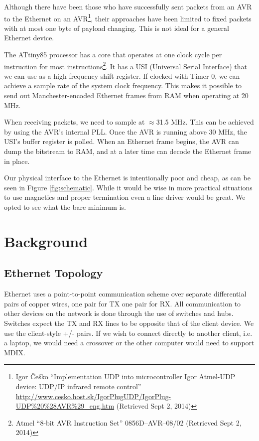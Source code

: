 \documentclass[13pt]{ltxdoc}
\begin{document}
Although there have been those who have successfully sent packets from an AVR to
the Ethernet on an AVR\footnote{Igor \v{C}e\v{s}ko ``Implementation UDP into microcontroller Igor Atmel-UDP device: UDP/IP infrared remote control'' \url{http://www.cesko.host.sk/IgorPlugUDP/IgorPlug-UDP\%20\%28AVR\%29_eng.htm} (Retrieved Sept 2, 2014)}, their approaches have been limited
to fixed packets with at most one byte of payload changing.  This is not ideal
for a general Ethernet device.

The ATtiny85 processor has a core that operates at one clock cycle per instruction
for most instructions\footnote{Atmel ``8-bit AVR Instruction Set'' 0856D–AVR–08/02 (Retrieved Sept 2, 2014)}.  It has a USI (Universal Serial Interface)
that we can use as a high frequency shift register.  If clocked with Timer 0, 
we can achieve a sample rate of the system clock frequency.  This makes it possible
to send out Manchester-encoded Ethernet frames from RAM when operating at 20 MHz. 

When receiving packets, we need to sample at $\approx$31.5 MHz.  This can be achieved
by using the AVR's internal PLL.  Once the AVR is running above 30 MHz, the USI's 
buffer register is polled.  When an Ethernet frame begins, the AVR can dump the 
bitstream to RAM, and at a later time can decode the Ethernet frame in place.

Our physical interface to the Ethernet is intentionally poor and cheap, as can be seen in
Figure \ref{fig:schematic}.  While
it would be wise in more practical situations to use magnetics and proper termination
even a line driver would be great.  We opted to see what the bare minimum is.

\section{Background}

\subsection{Ethernet Topology}
Ethernet uses a point-to-point communication scheme over separate differential pairs of copper wires, one pair for TX one pair for RX. 
All communication to other devices on the network
is done through the use of switches and hubs.  Switches expect the TX and RX lines to
be opposite that of the client device.  We use the client-style +/- pairs.  If we wish
to connect directly to another client, i.e. a laptop, we would need a crossover or the
other computer would need to support MDIX.
\end{document}

